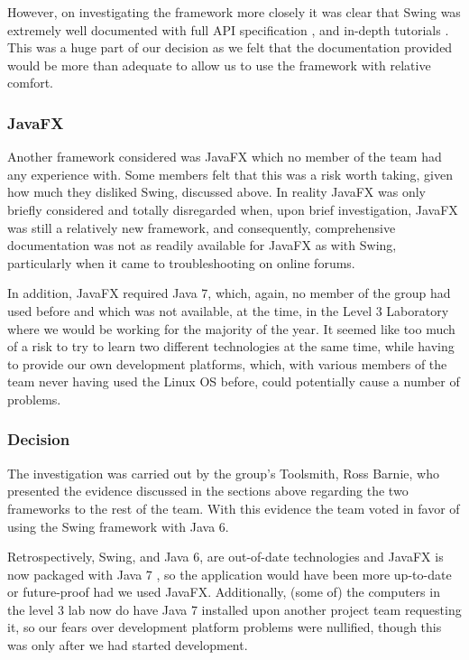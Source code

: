 However, on investigating the framework more closely it was clear that
Swing was extremely well documented with full API specification
\cite{swingAPI}, and in-depth tutorials \cite{swingTutorial}.
This was a huge part of our decision as we felt that the documentation
provided would be more than adequate to allow us to use the framework
with relative comfort.


\subsubsection{JavaFX}
\label{impl:ui:guiframework:javafx}

Another framework considered was JavaFX which no member of the team
had any experience with. 
Some members felt that this was a risk worth taking, given how much
they disliked Swing, discussed above.
In reality JavaFX was only briefly considered and totally disregarded
when, upon brief investigation, JavaFX was still a relatively new
framework, and consequently, comprehensive documentation was not as
readily available for JavaFX as with Swing, particularly when it came 
to troubleshooting on online forums.

In addition, JavaFX required Java 7, which, again, no member of the
group had used before and which was not available, at the time, in the
Level 3 Laboratory where we would be working for the majority of the
year.
It seemed like too much of a risk to try to learn two different
technologies at the same time, while having to provide our own
development platforms, which, with various members of the team never
having used the Linux OS before, could potentially cause a number of
problems.


\subsubsection{Decision}
\label{impl:ui:guiframework:decision}

The investigation was carried out by the group's Toolsmith, Ross
Barnie, who presented the evidence discussed in the sections above
regarding the two frameworks to the rest of the team.
With this evidence the team voted in favor of using the Swing
framework with Java 6.

Retrospectively, Swing, and Java 6, are out-of-date technologies and
JavaFX is now packaged with Java 7 \cite{javafxOverview}, so the
application would have been more up-to-date or future-proof had we
used JavaFX.
Additionally, (some of) the computers in the level 3 lab now do have
Java 7 installed upon another project team requesting it, so our fears
over development platform problems were nullified, though this was
only after we had started development.

